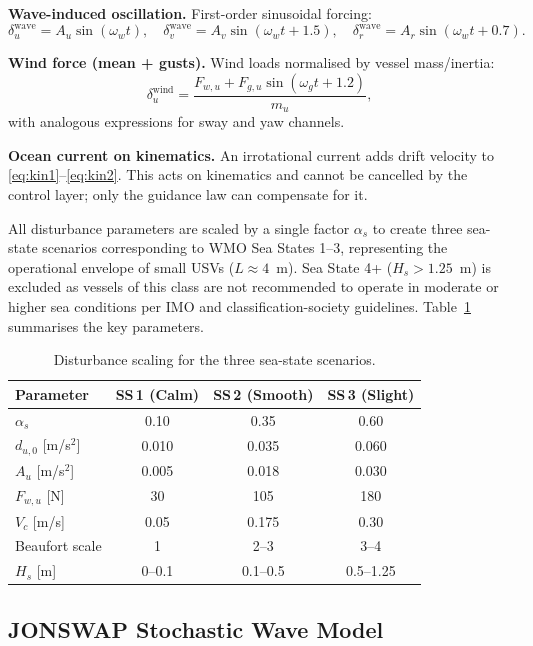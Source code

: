\documentclass[review]{cas-dc}
\begin{document}
\textbf{Wave-induced oscillation.} First-order sinusoidal forcing:
\begin{equation}
\delta_u^{\mathrm{wave}} = A_u\sin(\omega_w t), \quad \delta_v^{\mathrm{wave}} = A_v\sin(\omega_w t + 1.5), \quad \delta_r^{\mathrm{wave}} = A_r\sin(\omega_w t + 0.7).
\end{equation}

\textbf{Wind force (mean + gusts).} Wind loads normalised by vessel mass/inertia:
\begin{equation}
\delta_u^{\mathrm{wind}} = \frac{F_{w,u} + F_{g,u}\sin(\omega_g t + 1.2)}{m_u},
\end{equation}
with analogous expressions for sway and yaw channels.

\textbf{Ocean current on kinematics.} An irrotational current adds drift velocity to \eqref{eq:kin1}--\eqref{eq:kin2}. This acts on kinematics and cannot be cancelled by the control layer; only the guidance law can compensate for it.

All disturbance parameters are scaled by a single factor $\alpha_s$ to create three sea-state scenarios corresponding to WMO Sea States 1--3, representing the operational envelope of small USVs ($L \approx 4$~m). Sea State 4+ ($H_s > 1.25$~m) is excluded as vessels of this class are not recommended to operate in moderate or higher sea conditions per IMO and classification-society guidelines. Table~\ref{tab:disturbance} summarises the key parameters.

\begin{table}[t]
\centering
\caption{Disturbance scaling for the three sea-state scenarios.}
\label{tab:disturbance}
\begin{tabular}{lccc}
\toprule
Parameter & SS\,1 (Calm) & SS\,2 (Smooth) & SS\,3 (Slight) \\
\midrule
$\alpha_s$ & 0.10 & 0.35 & 0.60 \\
$d_{u,0}$ [m/s$^2$] & 0.010 & 0.035 & 0.060 \\
$A_u$ [m/s$^2$] & 0.005 & 0.018 & 0.030 \\
$F_{w,u}$ [N] & 30 & 105 & 180 \\
$V_c$ [m/s] & 0.05 & 0.175 & 0.30 \\
Beaufort scale & 1 & 2--3 & 3--4 \\
$H_s$ [m] & 0--0.1 & 0.1--0.5 & 0.5--1.25 \\
\bottomrule
\end{tabular}
\end{table}


\subsection{JONSWAP Stochastic Wave Model}
\label{sec:jonswap_model}
\end{document}
